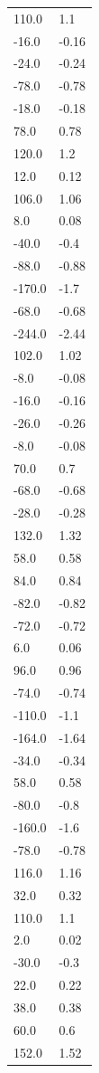 \begin{longtable}{ll}
110.0 & 1.1 \\
-16.0 & -0.16 \\
-24.0 & -0.24 \\
-78.0 & -0.78 \\
-18.0 & -0.18 \\
78.0 & 0.78 \\
120.0 & 1.2 \\
12.0 & 0.12 \\
106.0 & 1.06 \\
8.0 & 0.08 \\
-40.0 & -0.4 \\
-88.0 & -0.88 \\
-170.0 & -1.7 \\
-68.0 & -0.68 \\
-244.0 & -2.44 \\
102.0 & 1.02 \\
-8.0 & -0.08 \\
-16.0 & -0.16 \\
-26.0 & -0.26 \\
-8.0 & -0.08 \\
70.0 & 0.7 \\
-68.0 & -0.68 \\
-28.0 & -0.28 \\
132.0 & 1.32 \\
58.0 & 0.58 \\
84.0 & 0.84 \\
-82.0 & -0.82 \\
-72.0 & -0.72 \\
6.0 & 0.06 \\
96.0 & 0.96 \\
-74.0 & -0.74 \\
-110.0 & -1.1 \\
-164.0 & -1.64 \\
-34.0 & -0.34 \\
58.0 & 0.58 \\
-80.0 & -0.8 \\
-160.0 & -1.6 \\
-78.0 & -0.78 \\
116.0 & 1.16 \\
32.0 & 0.32 \\
110.0 & 1.1 \\
2.0 & 0.02 \\
-30.0 & -0.3 \\
22.0 & 0.22 \\
38.0 & 0.38 \\
60.0 & 0.6 \\
152.0 & 1.52 \\

\end{longtable}
